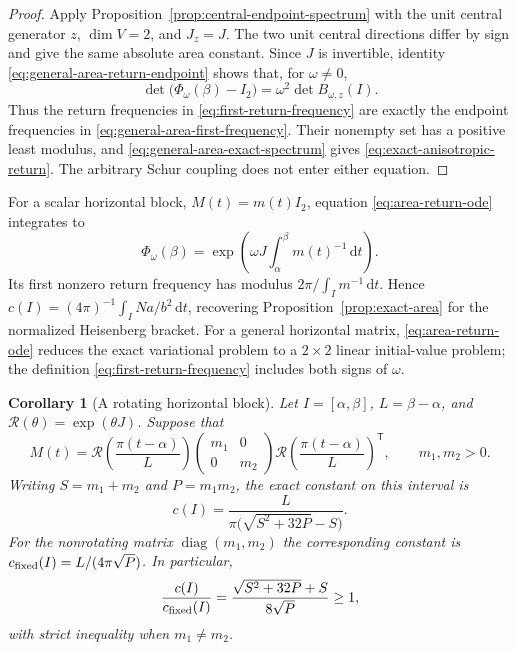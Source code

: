 \documentclass[10pt,a4paper]{article}
\numberwithin{equation}{section}
\newtheorem{corollary}[theorem]{Corollary}
\theoremstyle{definition}
\theoremstyle{remark}
\newcommand{\dd}{\mathrm d}
\begin{document}
\begin{proof}
Apply Proposition~\ref{prop:central-endpoint-spectrum} with the unit
central generator $z$, $\dim V=2$, and $J_z=J$.  The two unit central
directions differ by sign and give the same absolute area constant.
Since $J$ is invertible, identity
\eqref{eq:general-area-return-endpoint} shows that, for $\omega\ne0$,
\[
 \det\bigl(\Phi_\omega(\beta)-I_2\bigr)
   =\omega^2\det B_{\omega,z}(I).
\]
Thus the return frequencies in \eqref{eq:first-return-frequency} are
exactly the endpoint frequencies in
\eqref{eq:general-area-first-frequency}.  Their nonempty set has a
positive least modulus, and
\eqref{eq:general-area-exact-spectrum} gives
\eqref{eq:exact-anisotropic-return}.  The arbitrary Schur coupling does
not enter either equation.
\end{proof}

For a scalar horizontal block, $M(t)=m(t)I_2$, equation
\eqref{eq:area-return-ode} integrates to
\[
 \Phi_\omega(\beta)
 =\exp\left(\omega J\int_\alpha^\beta m(t)^{-1}\,\dd t\right).
\]
Its first nonzero return frequency has modulus
$2\pi/\int_I m^{-1}\,\dd t$.  Hence
$c(I)=(4\pi)^{-1}\int_I Na/b^2\,\dd t$, recovering
Proposition~\ref{prop:exact-area} for the normalized Heisenberg bracket.
For a general horizontal matrix, \eqref{eq:area-return-ode} reduces the
exact variational problem to a $2\times2$ linear initial-value problem;
the definition \eqref{eq:first-return-frequency} includes both signs of
$\omega$.

\begin{corollary}[A rotating horizontal block]
\label{cor:rotating-area}
Let $I=[\alpha,\beta]$, $L=\beta-\alpha$, and
$\mathcal R(\theta)=\exp(\theta J)$.  Suppose that
\begin{equation}
 M(t)=\mathcal R\left(\frac{\pi(t-\alpha)}L\right)
 \begin{pmatrix}m_1&0\\0&m_2\end{pmatrix}
 \mathcal R\left(\frac{\pi(t-\alpha)}L\right)^{\!\mathsf T},
 \qquad m_1,m_2>0.
 \label{eq:rotating-horizontal-block}
\end{equation}
Writing $S=m_1+m_2$ and $P=m_1m_2$, the exact constant on this interval is
\begin{equation}
 c(I)=\frac{L}{\pi\bigl(\sqrt{S^2+32P}-S\bigr)}.
 \label{eq:rotating-area-constant}
\end{equation}
For the nonrotating matrix $\operatorname{diag}(m_1,m_2)$ the corresponding
constant is $c_{\rm fixed}(I)=L/(4\pi\sqrt P)$.  In particular,
\begin{equation}
 \frac{c(I)}{c_{\rm fixed}(I)}
 =\frac{\sqrt{S^2+32P}+S}{8\sqrt P}\ge1,
 \label{eq:rotating-area-ratio}
\end{equation}
with strict inequality when $m_1\ne m_2$.
\end{corollary}
\end{document}
